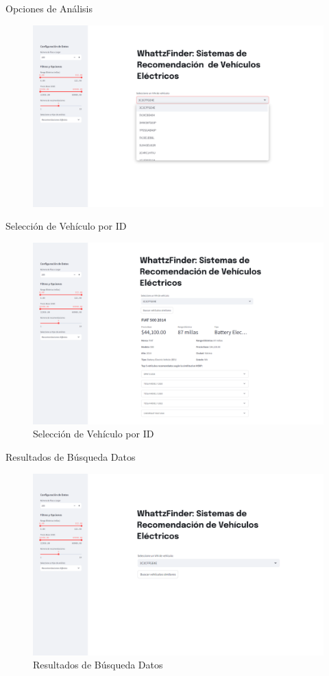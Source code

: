 \documentclass[12pt]{article}
\begin{document}
Opciones de Análisis
\begin{figure}[htbp]
    \centering
    \includegraphics[width=\textwidth]{./imgs-latex/img2.png}\label{fig:img2}
\end{figure}

Selección de Vehículo por ID
\begin{figure}[htbp]
    \centering
    \includegraphics[width=\textwidth]{./imgs-latex/img3.png}
    \caption{Selección de Vehículo por ID}
    \label{fig:img3}
\end{figure}

Resultados de Búsqueda \- Datos
\begin{figure}[htbp]
    \centering
    \includegraphics[width=\textwidth]{./imgs-latex/img4.png}
    \caption{Resultados de Búsqueda \- Datos}
    \label{fig:img4}
\end{figure}
\end{document}
